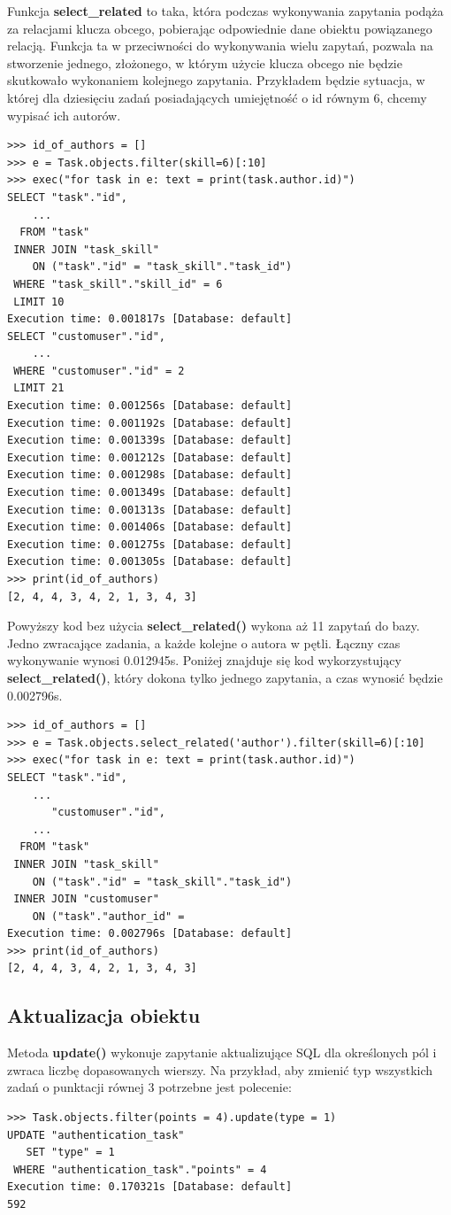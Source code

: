 \documentclass[oneside,polski,logo,indent]{amuthesis}
\begin{document}
\begin{enumerate}
\begin{enumerate}
Funkcja \textbf{select\_related} to taka, która podczas wykonywania zapytania podąża za relacjami klucza obcego, pobierając odpowiednie dane obiektu powiązanego relacją.
Funkcja ta w przeciwności do wykonywania wielu zapytań, pozwala na stworzenie jednego, złożonego, w którym użycie klucza obcego nie będzie skutkowało wykonaniem kolejnego zapytania. Przykładem będzie sytuacja, w której dla dziesięciu zadań posiadających umiejętność o id równym 6, chcemy wypisać ich autorów.
\begin{lstlisting}[style=DOS]
>>> id_of_authors = []
>>> e = Task.objects.filter(skill=6)[:10]
>>> exec("for task in e: text = print(task.author.id)")
SELECT "task"."id",
	...
  FROM "task"
 INNER JOIN "task_skill"
    ON ("task"."id" = "task_skill"."task_id")
 WHERE "task_skill"."skill_id" = 6
 LIMIT 10
Execution time: 0.001817s [Database: default]
SELECT "customuser"."id",
	...
 WHERE "customuser"."id" = 2
 LIMIT 21
Execution time: 0.001256s [Database: default]
Execution time: 0.001192s [Database: default]
Execution time: 0.001339s [Database: default]
Execution time: 0.001212s [Database: default]
Execution time: 0.001298s [Database: default]
Execution time: 0.001349s [Database: default]
Execution time: 0.001313s [Database: default]
Execution time: 0.001406s [Database: default]
Execution time: 0.001275s [Database: default]
Execution time: 0.001305s [Database: default]
>>> print(id_of_authors)
[2, 4, 4, 3, 4, 2, 1, 3, 4, 3]
\end{lstlisting}
Powyższy kod bez użycia \textbf{select\_related()} wykona aż 11 zapytań do bazy. Jedno zwracające zadania, a każde kolejne o autora w pętli. Łączny czas wykonywanie wynosi 0.012945s. Poniżej znajduje się kod wykorzystujący \textbf{select\_related()}, który dokona tylko jednego zapytania, a czas wynosić będzie 0.002796s.
\begin{lstlisting}[style=DOS]
>>> id_of_authors = []
>>> e = Task.objects.select_related('author').filter(skill=6)[:10]
>>> exec("for task in e: text = print(task.author.id)")
SELECT "task"."id",
	...
       "customuser"."id",
	...
  FROM "task"
 INNER JOIN "task_skill"
    ON ("task"."id" = "task_skill"."task_id")
 INNER JOIN "customuser"
    ON ("task"."author_id" =
Execution time: 0.002796s [Database: default]
>>> print(id_of_authors)
[2, 4, 4, 3, 4, 2, 1, 3, 4, 3]
\end{lstlisting}
\subsection{Aktualizacja obiektu}
Metoda \textbf{update()} wykonuje zapytanie aktualizujące SQL dla określonych pól i zwraca liczbę dopasowanych wierszy. Na przykład, aby zmienić typ wszystkich zadań o punktacji równej 3 potrzebne jest polecenie:
\begin{lstlisting}[style=DOS]
>>> Task.objects.filter(points = 4).update(type = 1)
UPDATE "authentication_task"
   SET "type" = 1
 WHERE "authentication_task"."points" = 4
Execution time: 0.170321s [Database: default]
592
\end{lstlisting}

\end{enumerate}
\end{enumerate}
\end{document}
